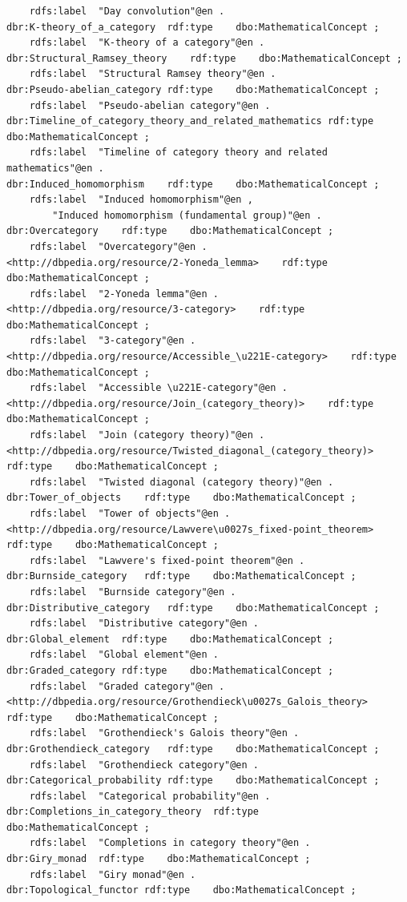 \begin{verbatim}
	rdfs:label	"Day convolution"@en .
dbr:K-theory_of_a_category	rdf:type	dbo:MathematicalConcept ;
	rdfs:label	"K-theory of a category"@en .
dbr:Structural_Ramsey_theory	rdf:type	dbo:MathematicalConcept ;
	rdfs:label	"Structural Ramsey theory"@en .
dbr:Pseudo-abelian_category	rdf:type	dbo:MathematicalConcept ;
	rdfs:label	"Pseudo-abelian category"@en .
dbr:Timeline_of_category_theory_and_related_mathematics	rdf:type	dbo:MathematicalConcept ;
	rdfs:label	"Timeline of category theory and related mathematics"@en .
dbr:Induced_homomorphism	rdf:type	dbo:MathematicalConcept ;
	rdfs:label	"Induced homomorphism"@en ,
		"Induced homomorphism (fundamental group)"@en .
dbr:Overcategory	rdf:type	dbo:MathematicalConcept ;
	rdfs:label	"Overcategory"@en .
<http://dbpedia.org/resource/2-Yoneda_lemma>	rdf:type	dbo:MathematicalConcept ;
	rdfs:label	"2-Yoneda lemma"@en .
<http://dbpedia.org/resource/3-category>	rdf:type	dbo:MathematicalConcept ;
	rdfs:label	"3-category"@en .
<http://dbpedia.org/resource/Accessible_\u221E-category>	rdf:type	dbo:MathematicalConcept ;
	rdfs:label	"Accessible \u221E-category"@en .
<http://dbpedia.org/resource/Join_(category_theory)>	rdf:type	dbo:MathematicalConcept ;
	rdfs:label	"Join (category theory)"@en .
<http://dbpedia.org/resource/Twisted_diagonal_(category_theory)>	rdf:type	dbo:MathematicalConcept ;
	rdfs:label	"Twisted diagonal (category theory)"@en .
dbr:Tower_of_objects	rdf:type	dbo:MathematicalConcept ;
	rdfs:label	"Tower of objects"@en .
<http://dbpedia.org/resource/Lawvere\u0027s_fixed-point_theorem>	rdf:type	dbo:MathematicalConcept ;
	rdfs:label	"Lawvere's fixed-point theorem"@en .
dbr:Burnside_category	rdf:type	dbo:MathematicalConcept ;
	rdfs:label	"Burnside category"@en .
dbr:Distributive_category	rdf:type	dbo:MathematicalConcept ;
	rdfs:label	"Distributive category"@en .
dbr:Global_element	rdf:type	dbo:MathematicalConcept ;
	rdfs:label	"Global element"@en .
dbr:Graded_category	rdf:type	dbo:MathematicalConcept ;
	rdfs:label	"Graded category"@en .
<http://dbpedia.org/resource/Grothendieck\u0027s_Galois_theory>	rdf:type	dbo:MathematicalConcept ;
	rdfs:label	"Grothendieck's Galois theory"@en .
dbr:Grothendieck_category	rdf:type	dbo:MathematicalConcept ;
	rdfs:label	"Grothendieck category"@en .
dbr:Categorical_probability	rdf:type	dbo:MathematicalConcept ;
	rdfs:label	"Categorical probability"@en .
dbr:Completions_in_category_theory	rdf:type	dbo:MathematicalConcept ;
	rdfs:label	"Completions in category theory"@en .
dbr:Giry_monad	rdf:type	dbo:MathematicalConcept ;
	rdfs:label	"Giry monad"@en .
dbr:Topological_functor	rdf:type	dbo:MathematicalConcept ;

\end{verbatim}
